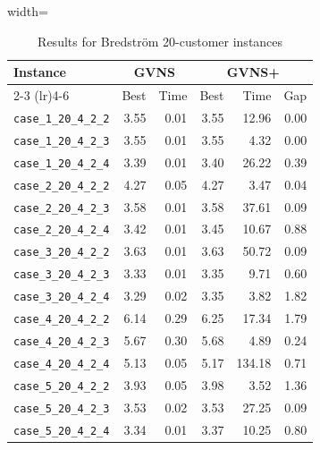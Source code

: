 \documentclass{article}
\begin{document}
\begin{table}[ht]
\centering
\small
\setlength{\tabcolsep}{3pt}
\caption{Results for Bredström 20-customer instances}
\vspace{4mm}
\begin{adjustbox}{width=\textwidth}
\begin{tabular}{l r r @{\hspace{4pt}} r r r}
\toprule
\multirow{2}{*}{Instance} & \multicolumn{2}{c}{GVNS} & \multicolumn{3}{c}{GVNS+} \\
\cmidrule(lr){2-3} \cmidrule(lr){4-6}
 & Best & Time & Best & Time & Gap \\
\midrule
\texttt{case\_1\_20\_4\_2\_2} & 3.55 & 0.01 & 3.55 & 12.96 & 0.00 \\
\texttt{case\_1\_20\_4\_2\_3} & 3.55 & 0.01 & 3.55 & 4.32 & 0.00 \\
\texttt{case\_1\_20\_4\_2\_4} & 3.39 & 0.01 & 3.40 & 26.22 & 0.39 \\
\texttt{case\_2\_20\_4\_2\_2} & 4.27 & 0.05 & 4.27 & 3.47 & 0.04 \\
\texttt{case\_2\_20\_4\_2\_3} & 3.58 & 0.01 & 3.58 & 37.61 & 0.09 \\
\texttt{case\_2\_20\_4\_2\_4} & 3.42 & 0.01 & 3.45 & 10.67 & 0.88 \\
\texttt{case\_3\_20\_4\_2\_2} & 3.63 & 0.01 & 3.63 & 50.72 & 0.09 \\
\texttt{case\_3\_20\_4\_2\_3} & 3.33 & 0.01 & 3.35 & 9.71 & 0.60 \\
\texttt{case\_3\_20\_4\_2\_4} & 3.29 & 0.02 & 3.35 & 3.82 & 1.82 \\
\texttt{case\_4\_20\_4\_2\_2} & 6.14 & 0.29 & 6.25 & 17.34 & 1.79 \\
\texttt{case\_4\_20\_4\_2\_3} & 5.67 & 0.30 & 5.68 & 4.89 & 0.24 \\
\texttt{case\_4\_20\_4\_2\_4} & 5.13 & 0.05 & 5.17 & 134.18 & 0.71 \\
\texttt{case\_5\_20\_4\_2\_2} & 3.93 & 0.05 & 3.98 & 3.52 & 1.36 \\
\texttt{case\_5\_20\_4\_2\_3} & 3.53 & 0.02 & 3.53 & 27.25 & 0.09 \\
\texttt{case\_5\_20\_4\_2\_4} & 3.34 & 0.01 & 3.37 & 10.25 & 0.80 \\
\bottomrule
\end{tabular}
\end{adjustbox}
\end{table}
\end{document}
